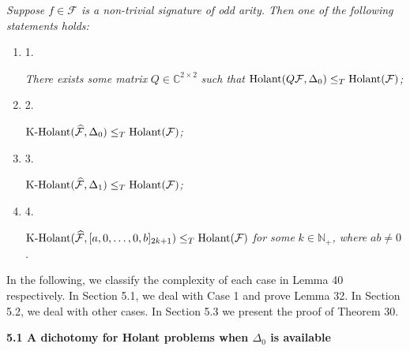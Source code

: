 \documentclass[10pt,a4paper]{article}
\begin{document}
\emph{Suppose $f\in\mathcal{F}$ is a non-trivial signature of odd arity. Then one of the following statements holds:}\par


\begin{enumerate}


\item[] 
1. 


\emph{There exists some matrix }$Q\in\mathbb{C}^{2\times 2}$\emph{ such that }$\textup{{Holant}}(Q\mathcal{F},\Delta_{0})\leq_{T}\textup{{Holant}}(\mathcal{F})$\emph{;}\par





\item[] 
2. 


$\textup{{K-Holant}}(\widehat{\mathcal{F}},\Delta_{0})\leq_{T}\textup{{Holant}}(\mathcal{F})$\emph{;}\par





\item[] 
3. 


$\textup{{K-Holant}}(\widehat{\mathcal{F}},\Delta_{1})\leq_{T}\textup{{Holant}}(\mathcal{F})$\emph{;}\par





\item[] 
4. 


$\textup{{K-Holant}}(\widehat{\mathcal{F}},[a,0,\dots,0,b]_{2k+1})\leq_{T}\textup{{Holant}}(\mathcal{F})$\emph{ for some }$k\in\mathbb{N}_{+}$\emph{, where }$ab\neq 0$\emph{.}\par





\end{enumerate}






In the following, we classify the complexity of each case in Lemma 40 respectively. In Section 5.1, we deal with Case 1 and prove Lemma 32. In Section 5.2, we deal with other cases. In Section 5.3 we present the proof of Theorem 30.\par




\par\medskip\noindent\textbf{
5.1 A dichotomy for Holant problems when $\Delta_{0}$ is available}\par
\end{document}
